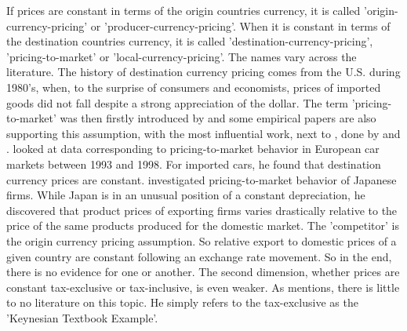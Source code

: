 If prices are constant in terms of the origin countries currency, it is called 'origin-currency-pricing' or 'producer-currency-pricing'. When it is constant in terms of the destination countries currency, it is called 'destination-currency-pricing', 'pricing-to-market' or 'local-currency-pricing'. The names vary across the literature. The history of destination currency pricing comes from the U.S. during 1980's, when, to the surprise of consumers and economists, prices of imported goods did not fall despite a strong appreciation of the dollar. The term 'pricing-to-market' was then firstly introduced by \cite{krugman1986pricing} and some empirical papers are also supporting this assumption, with the most influential work, next to \cite{krugman1986pricing}, done by \cite{gil2002export} and \cite{marston1990pricing}. \cite{gil2002export} looked at data corresponding to pricing-to-market behavior in European car markets between 1993 and 1998. For imported cars, he found that destination currency prices are constant. \cite{marston1990pricing} investigated pricing-to-market behavior of Japanese firms. While Japan is in an unusual position of a constant depreciation, he discovered that product prices of exporting firms varies drastically relative to the price of the same products produced for the domestic market. The 'competitor' is the origin currency pricing assumption. So relative export to domestic prices of a given country are constant following an exchange rate movement. So in the end, there is no evidence for one or another. The second dimension, whether prices are constant tax-exclusive or tax-inclusive, is even weaker. As \cite{buiter2017exchange} mentions, there is little to no literature on this topic. He simply refers to the tax-exclusive as the 'Keynesian Textbook Example'. \\ 
